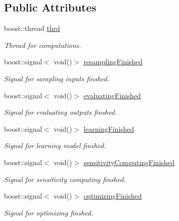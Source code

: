 \subsection*{Public Attributes}
\begin{DoxyCompactItemize}
\item 
boost\-::thread \hyperlink{class_go_s_u_m_1_1_c_container_ac682522f6ba4e2a19e78a7f603b8c52c}{thrd}
\begin{DoxyCompactList}\small\item\em Thread for computations. \end{DoxyCompactList}\item 
boost\-::signal$<$ void()$>$ \hyperlink{class_go_s_u_m_1_1_c_container_a8ffc8d8267d0e21fd4129e9edaaf2e95}{resampling\-Finished}
\begin{DoxyCompactList}\small\item\em Signal for sampling inputs finshed. \end{DoxyCompactList}\item 
boost\-::signal$<$ void()$>$ \hyperlink{class_go_s_u_m_1_1_c_container_a261e36612f2614a6fd79c87b0d432fab}{evaluating\-Finished}
\begin{DoxyCompactList}\small\item\em Signal for evaluating outputs finshed. \end{DoxyCompactList}\item 
boost\-::signal$<$ void()$>$ \hyperlink{class_go_s_u_m_1_1_c_container_a9068a47de6aaaf67765f9e0ebd407e8a}{learning\-Finished}
\begin{DoxyCompactList}\small\item\em Signal for learning model finshed. \end{DoxyCompactList}\item 
boost\-::signal$<$ void()$>$ \hyperlink{class_go_s_u_m_1_1_c_container_a5d2ebab5941a91bb36e6c5bad4764d88}{sensitivity\-Computing\-Finished}
\begin{DoxyCompactList}\small\item\em Signal for sensitivity computing finshed. \end{DoxyCompactList}\item 
boost\-::signal$<$ void()$>$ \hyperlink{class_go_s_u_m_1_1_c_container_a13d00751fa7d80b99cba527e8d57327c}{optimizing\-Finished}
\begin{DoxyCompactList}\small\item\em Signal for optimizing finshed. \end{DoxyCompactList}\end{DoxyCompactItemize}
